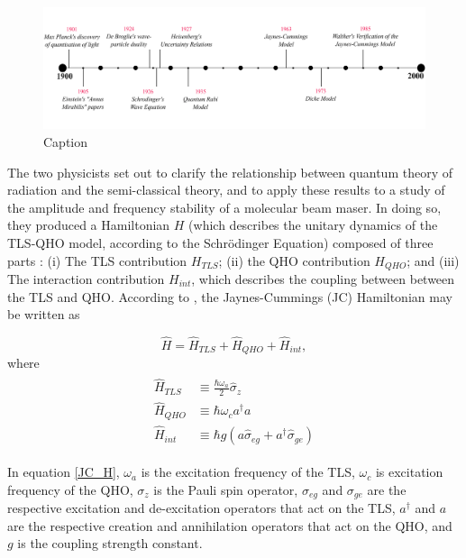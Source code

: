 \documentclass[12pt,a4paper]{article}
\begin{document}
\begin{figure}
    \centering
    \includegraphics[scale=0.65]{timeline_JCM}
    \caption{Caption}
    \label{fig:enter-label}
\end{figure}


The two physicists set out to clarify the relationship between quantum theory of radiation and the semi-classical theory, and to apply these results to a study of the amplitude and frequency stability of a molecular beam maser. In doing so, they produced a Hamiltonian $H$ (which describes the unitary dynamics of the TLS-QHO model, according to the Schrödinger Equation) composed of three parts \cite{Hamiltonian2012-JC_Friction}: (i) The TLS contribution $H_{TLS}$; (ii) the QHO  contribution $H_{QHO}$; and (iii) The interaction contribution $H_{int}$, which describes the coupling between between the TLS and QHO. According to \cite{General2024-JCM_relevance}, the Jaynes-Cummings (JC) Hamiltonian may be written as

\begin{equation}
    \hat{H} = \hat{H}_{TLS} + \hat{H}_{QHO} + \hat{H}_{int}, 
\end{equation} \label{JC_H}
where 
\begin{align*}
    \begin{aligned}
        \hat{H}_{TLS} &\equiv \frac{\hbar\omega_a}{2}\hat{\sigma}_z \\
        \hat{H}_{QHO} &\equiv \hbar\omega_ca^\dagger a \\
        \hat{H}_{int} &\equiv \hbar g(a\hat{\sigma}_{eg} + a^\dagger\hat{\sigma}_{ge})
    \end{aligned}
\end{align*}

In equation \eqref{JC_H}, $\omega_a$ is the excitation frequency of the TLS, $\omega_c$ is excitation frequency of the QHO, $\sigma_z$ is the Pauli spin operator, $\sigma_{eg}$ and $\sigma_{ge}$ are the respective excitation and de-excitation operators that act on the TLS, $a^\dagger$ and $a$ are the respective creation and annihilation operators that act on the QHO, and $g$ is the coupling strength constant. 
\end{document}
